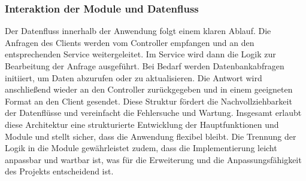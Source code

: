 \subsubsection*{Interaktion der Module und Datenfluss}
Der Datenfluss innerhalb der Anwendung folgt einem klaren Ablauf. Die Anfragen des Clients werden vom Controller empfangen und an den entsprechenden Service weitergeleitet. Im Service wird dann die Logik zur Bearbeitung der Anfrage ausgeführt. Bei Bedarf werden Datenbankabfragen initiiert, um Daten abzurufen oder zu aktualisieren. Die Antwort wird anschließend wieder an den Controller zurückgegeben und in einem geeigneten Format an den Client gesendet. Diese Struktur fördert die Nachvollziehbarkeit der Datenflüsse und vereinfacht die Fehlersuche und Wartung.
\newline
Insgesamt erlaubt diese Architektur eine strukturierte Entwicklung der Hauptfunktionen und Module und stellt sicher, dass die Anwendung flexibel bleibt. Die Trennung der Logik in die Module gewährleistet zudem, dass die Implementierung leicht anpassbar und wartbar ist, was für die Erweiterung und die Anpassungsfähigkeit des Projekts entscheidend ist.
\label{chap:kapitel6}